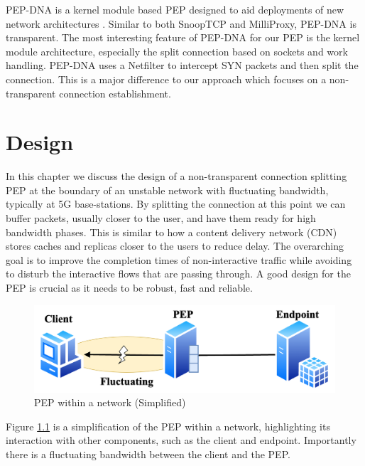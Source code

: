 \documentclass[a4paper,english, 11pt]{report}
\begin{document}
PEP-DNA is a kernel module based PEP designed to aid deployments of new network architectures \cite{pep_dna}. Similar to both SnoopTCP and MilliProxy, PEP-DNA is transparent. The most interesting feature of PEP-DNA for our PEP is the kernel module architecture, especially the split connection based on sockets and work handling. PEP-DNA uses a Netfilter to intercept SYN packets and then split the connection. This is a major difference to our approach which focuses on a non-transparent connection establishment.

\chapter{Design} %
In this chapter we discuss the design of a non-transparent connection splitting PEP at the boundary of an unstable network with fluctuating bandwidth, typically at 5G base-stations. By splitting the connection at this point we can buffer packets, usually closer to the user, and have them ready for high bandwidth phases. This is similar to how a content delivery network (CDN) stores caches and replicas closer to the users to reduce delay. The overarching goal is to improve the completion times of non-interactive traffic while avoiding to disturb the interactive flows that are passing through. A good design for the PEP is crucial as it needs to be robust, fast and reliable. \\

\begin{figure} %
	\centering
	\includegraphics[scale=0.45]{../diagrams/drawio/simple_pep_design.png}
  	\caption{PEP within a network (Simplified)}
  	\label{fig:simple_pep_design}
\end{figure}

Figure \ref{fig:simple_pep_design} is a simplification of the PEP within a network, highlighting its interaction with other components, such as the client and endpoint. Importantly there is a fluctuating bandwidth between the client and the PEP.
\end{document}
